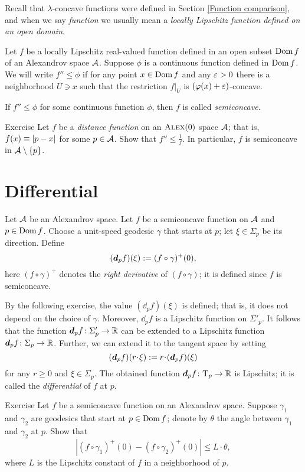 Recall that $\lambda$-concave functions were defined in Section \ref{Function comparison},
and when we say \textit{function} we usually mean a \textit{locally Lipschitz function defined on an open domain}.

Let $f$ be a locally Lipschitz real-valued function defined in an open subset $\mathop{\rm Dom}\nolimits f$ of an Alexandrov space $\mathcal{A}$.
Suppose $\phi$ is a continuous function defined in $\mathop{\rm Dom}\nolimits f$.
We will write $f''\le \phi$ if for any point $x\in \mathop{\rm Dom}\nolimits f$ and any $\varepsilon>0$ there is a neighborhood $U\ni x$ such that 
the restriction $f|_U$ is $(\varphi(x)+\varepsilon)$-concave.


If $f''\le \phi$ for some continuous function $\phi$, then $f$ is called  \emph{semiconcave}.


\begin{thm}{Exercise}\label{ex:distfun-semiconcave}
Let $f$ be a \emph{distance function} on an $\textsc{Alex}(0)$ space $\mathcal{A}$;
that is, $f(x)\equiv|{p}-{x}|_{}^{{}}$ for some $p\in \mathcal{A}$.
Show that $f''\le \tfrac1f$.
In particular, $f$ is semiconcave in $\mathcal{A}\setminus\{p\}$.
\end{thm}


\section{Differential}\label{sec:differential}


Let $\mathcal{A}$ be an Alexandrov space.
Let $f$ be a semiconcave function on $\mathcal{A}$ and $p\in \mathop{\rm Dom}\nolimits f$.
Choose a unit-speed geodesic $\gamma$ that starts at $p$;
let $\xi\in\Sigma_p$ be its direction.
Define 
\[(\bm{d}_pf)(\xi)\mathrel{:=}(f\circ\gamma)^+(0),\]
here $(f\circ\gamma)^+$ denotes the \emph{right derivative} of $(f\circ\gamma)$;
it is defined since $f$ is semiconcave.

By the following exercise, the value $(\dd_pf)(\xi)$ is defined; that is, it does not depend on the choice of $\gamma$.
Moreover, $\dd_pf$ is a Lipschitz function on $\Sigma'_p$.
It follows that the function $\bm{d}_pf\colon\Sigma_p'\to\mathbb{R}$ can be extended to a Lipschitz function $\bm{d}_pf\colon\Sigma_p\to\mathbb{R}$.
Further, we can extend it to the tangent space by setting 
\[(\dd_pf)(r\cdot \xi)
\df
r\cdot (\dd_pf)(\xi)\]
for any $r\ge 0$ and $\xi\in\Sigma_p$.
The obtained function $\bm{d}_pf\colon\mathrm{T}_p\to\mathbb{R}$ is Lipschitz;
it is called the \emph{differential} of $f$ at $p$.

\begin{thm}{Exercise}\label{ex:df(xi)}
Let $f$ be a semiconcave function on an Alexandrov space.
Suppose $\gamma_1$ and $\gamma_2$ are geodesics that start at $p\in \mathop{\rm Dom}\nolimits f$;
denote by $\theta$ the angle between $\gamma_1$ and $\gamma_2$ at $p$.
Show that 
\[|(f\circ\gamma_1)^+(0)-(f\circ\gamma_2)^+(0)|\le L\cdot \theta,\]
where $L$ is the Lipschitz constant of $f$ in a neighborhood of $p$.
\end{thm}

